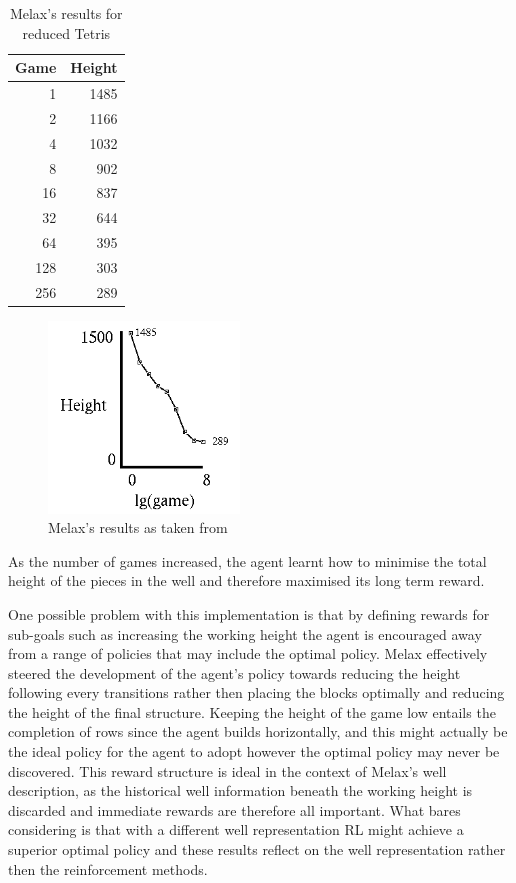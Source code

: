 \documentclass{rucsthesis}
\begin{document}
\begin{table}[h]
\centering
\begin{tabular}{|r|r|}
\hline
Game & Height  \\
\hline
    1 &  1485 \\
     2  & 1166 \\
     4  & 1032 \\
     8  &  902 \\
    16  &  837 \\
    32  &  644 \\
    64  &  395 \\
   128  &  303 \\
   256   & 289 \\
\hline
\end{tabular}
\caption{Melax's results for reduced Tetris}
\label{mresults}
\end{table}

\begin{figure}[h]
\centering
\includegraphics[width=2in]{melaxresults.png}
\caption{Melax's results as taken from \cite{melaxtetris}}
\label{fig:meres}
\end{figure}

As the number of games increased, the agent learnt how to minimise the total height of the pieces in the well and therefore maximised its long term reward.

One possible problem with this implementation is that by defining rewards for sub-goals such as increasing the working height the agent is encouraged away from a range of policies that may include the optimal policy.  Melax effectively steered the development of the agent's policy towards reducing the height following every transitions rather then placing the blocks optimally and reducing the height of the final structure. Keeping the height of the game low entails the completion of rows since the agent builds horizontally, and this might actually be the ideal policy for the agent to adopt however the optimal policy may never be discovered. This reward structure is ideal in the context of Melax's well description, as the historical well information beneath the working height is discarded and immediate rewards are therefore all important. What bares considering is that with a different well representation RL might achieve a superior optimal policy and these results reflect on the well representation rather then the reinforcement methods.
\end{document}

